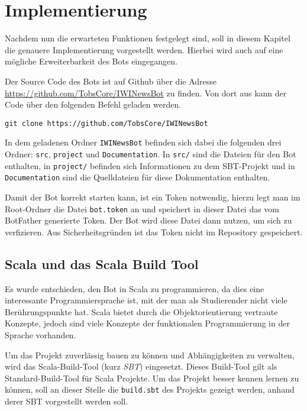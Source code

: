 \chapter{Implementierung}
Nachdem nun die erwarteten Funktionen festgelegt sind, soll in diesem Kapitel die genauere Implementierung vorgestellt werden. Hierbei wird auch auf eine mögliche Erweiterbarkeit des Bots eingegangen.

Der Source Code des Bots ist auf Github über die Adresse \url{https://github.com/TobsCore/IWINewsBot} zu finden. Von dort aus kann der Code über den folgenden Befehl geladen werden.

\begin{lstlisting}
git clone https://github.com/TobsCore/IWINewsBot
\end{lstlisting}

In dem geladenen Ordner \texttt{IWINewsBot} befinden sich dabei die folgenden drei Ordner: \texttt{src}, \texttt{project} und \texttt{Documentation}. In \texttt{src/} sind die Dateien für den Bot enthalten, in \texttt{project/} befinden sich Informationen zu dem SBT-Projekt und in \texttt{Documentation} sind die Quelldateien für diese Dokumentation enthalten.

Damit der Bot korrekt starten kann, ist ein Token notwendig, hierzu legt man im Root-Ordner die Datei \texttt{bot.token} an und speichert in dieser Datei das vom BotFather generierte Token. Der Bot wird diese Datei dann nutzen, um sich zu verfizieren. Aus Sicherheitsgründen ist das Token nicht im Repository gespeichert.

\section{Scala und das Scala Build Tool}
Es wurde entschieden, den Bot in Scala zu programmieren, da dies eine interessante Programmiersprache ist, mit der man als Studierender nicht viele Berührungspunkte hat. Scala bietet durch die Objektorientierung vertraute Konzepte, jedoch sind viele Konzepte der funktionalen Programmierung in der Sprache vorhanden.

Um das Projekt zuverlässig bauen zu können und Abhängigkeiten zu verwalten, wird das Scala-Build-Tool (kurz \emph{SBT}) eingesetzt. Dieses Build-Tool gilt als Standard-Build-Tool für Scala Projekte. Um das Projekt besser kennen lernen zu können, soll an dieser Stelle die \texttt{build.sbt} des Projekts gezeigt werden, anhand derer SBT vorgestellt werden soll.



